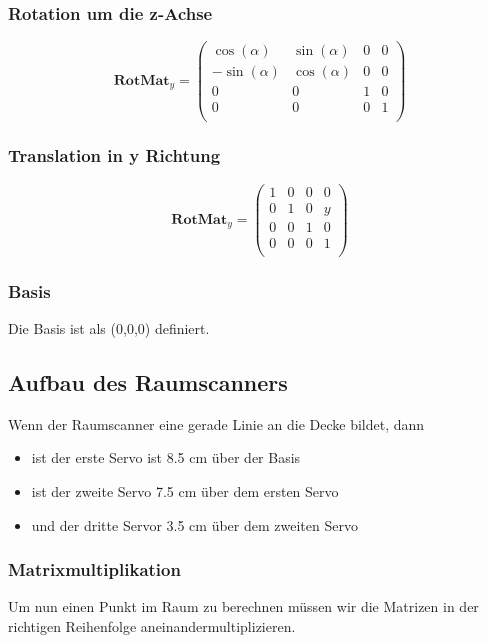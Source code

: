 \documentclass[a4paper,11pt,DIV11]{scrartcl}
\begin{document}
\subsubsection*{Rotation um die z-Achse}
\begin{equation}
\bm{RotMat}_{y} = 
\begin{pmatrix}
 \cos(\alpha) & \sin(\alpha) & 0 & 0 \\
-\sin(\alpha) & \cos(\alpha) & 0 & 0 \\
0 & 0 & 1 & 0 \\
0 & 0 & 0 & 1 \\
\end{pmatrix}
\end{equation}

\subsubsection*{Translation in y Richtung}
\begin{equation}
\bm{RotMat}_{y} = 
\begin{pmatrix}
1 & 0 & 0 & 0 \\
0 & 1 & 0 & y \\
0 & 0 & 1 & 0 \\
0 & 0 & 0 & 1 \\
\end{pmatrix}
\end{equation}

\subsubsection*{Basis}
Die Basis ist als (0,0,0) definiert.

\subsection{Aufbau des Raumscanners}
Wenn der Raumscanner eine gerade Linie an die Decke bildet, dann
\begin{itemize}
\item ist der erste Servo ist 8.5 cm über der Basis
\item ist der zweite Servo 7.5 cm über dem ersten Servo
\item und der dritte Servor 3.5 cm über dem zweiten Servo
\end{itemize}

\subsubsection*{Matrixmultiplikation}
Um nun einen Punkt im Raum zu berechnen müssen wir die Matrizen in der richtigen Reihenfolge aneinandermultiplizieren.
\end{document}
